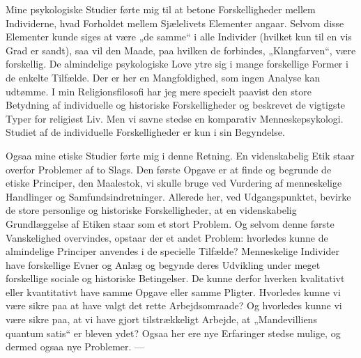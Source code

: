 \documentclass[12pt,a4paper,openany]{book}
\newcommand{\opage}[1]{\marginnote{\footnotesize\textit{[#1]}}}
\begin{document}
Mine psykologiske Studier førte mig til at betone Forskelligheder
mellem Individerne, hvad Forholdet mellem Sjælelivets
Elementer angaar. Selvom disse Elementer kunde siges at være
„de samme“ i alle Individer (hvilket kun til en vis Grad er
sandt), saa vil den Maade, paa hvilken de forbindes, „Klangfarven“,
være forskellig. De almindelige psykologiske Love ytre
sig i mange forskellige Former i de enkelte Tilfælde. Der er
her en Mangfoldighed, som ingen Analyse kan udtømme. I min
Religionsfilosofi har jeg mere specielt paavist den store Betydning
af individuelle og historiske Forskelligheder og beskrevet de
vigtigste Typer for religiøst Liv. Men vi savne stedse en komparativ
Menneskepsykologi. Studiet af de individuelle Forskelligheder
er kun i sin Begyndelse.

Ogsaa mine etiske Studier førte mig i denne Retning. En
videnskabelig Etik staar overfor Problemer af to Slags. Den
første Opgave er at finde og begrunde de etiske Principer, den
Maalestok, vi skulle bruge ved Vurdering af menneskelige Handlinger
og Samfundsindretninger. Allerede her, ved Udgangspunktet,
\setcounter{footnote}{0}%
\opage{25}bevirke de store personlige og historiske Forskelligheder, at en
videnskabelig Grundlæggelse af Etiken staar som et stort Problem.
Og selvom denne første Vanskelighed overvindes, opstaar
der et andet Problem: hvorledes kunne de almindelige Principer
anvendes i de specielle Tilfælde? Menneskelige Individer have
forskellige Evner og Anlæg og begynde deres Udvikling under
meget forskellige sociale og historiske Betingelser. De kunne
derfor hverken kvalitativt eller kvantitativt have samme Opgave
eller samme Pligter. Hvorledes kunne vi være sikre paa at
have valgt det rette Arbejdsomraade? Og hvorledes kunne vi
være sikre paa, at vi have gjort tilstrækkeligt Arbejde, at „Mandevilliens
quantum satis“ er bleven ydet? Ogsaa her ere nye Erfaringer
stedse mulige, og dermed ogsaa nye Problemer. ---
\end{document}

